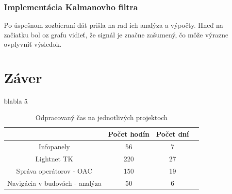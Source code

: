 \documentclass[11pt, oneside]{report}
\begin{document}
\subsection{Implementácia Kalmanovho filtra}
Po úspešnom zozbieraní dát prišla na rad ich analýza a výpočty. Hneď na začiatku bol oz grafu vidieť, že signál je značne zašumený, čo môže  výrazne ovplyvniť  výsledok. 

\newpage	
\chapter{Záver}
blabla ä
\begin{table}[h!]
\centering
\begin{tabular}{|c | c | c | c|} 
 \hline
  & Počet hodín & Počet dní\\ [0.5ex] 
 \hline
 Infopanely & 56 & 7  \\ 
Lightnet TK & 220 & 27  \\
Správa operátorov - OAC & 150 & 19  \\
 Navigácia v budovách - analýza& 50 & 6   \\
 \hline
\end{tabular}
\caption{Odpracovaný čas na jednotlivých projektoch}
\end{table}


\newpage
\thispagestyle{empty}
\nocite{*}
\clearpage

\printbibliography
\end{document}
